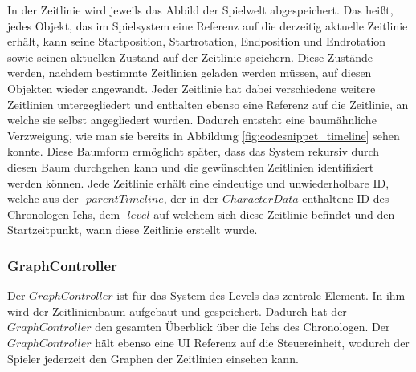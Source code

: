 In der Zeitlinie wird jeweils das Abbild der Spielwelt abgespeichert. Das heißt, jedes Objekt, das im Spielsystem eine Referenz auf die derzeitig aktuelle Zeitlinie erhält, kann seine Startposition, Startrotation, Endposition und Endrotation sowie seinen aktuellen Zustand auf der Zeitlinie speichern. Diese Zustände werden, nachdem bestimmte Zeitlinien geladen werden müssen, auf diesen Objekten wieder angewandt. Jeder Zeitlinie hat dabei verschiedene weitere Zeitlinien untergegliedert und enthalten ebenso eine Referenz auf die Zeitlinie, an welche sie selbst angegliedert wurden. Dadurch entsteht eine baumähnliche Verzweigung, wie man sie bereits in Abbildung \ref{fig:codesnippet_timeline} sehen konnte. Diese Baumform ermöglicht später, dass das System rekursiv durch diesen Baum durchgehen kann und die gewünschten Zeitlinien identifiziert werden können. Jede Zeitlinie erhält eine eindeutige und unwiederholbare \ac{ID}, welche aus der $\_parentTimeline$, der in der $CharacterData$ enthaltene \ac{ID} des Chronologen-Ichs, dem $\_level$ auf welchem sich diese Zeitlinie befindet und den Startzeitpunkt, wann diese Zeitlinie erstellt wurde.
\subsubsection{GraphController}
Der $GraphController$ ist für das System des Levels das zentrale Element. In ihm wird der Zeitlinienbaum aufgebaut und gespeichert. Dadurch hat der $GraphController$ den gesamten Überblick über die Ichs des Chronologen. Der $GraphController$ hält ebenso eine \ac{UI} Referenz auf die Steuereinheit, wodurch der Spieler jederzeit den Graphen der Zeitlinien einsehen kann.

